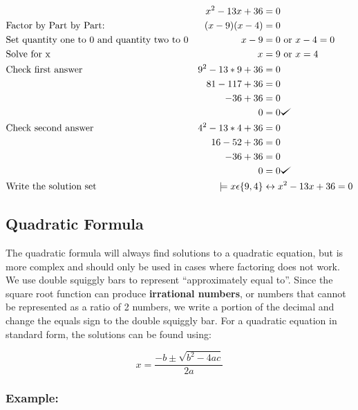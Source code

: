 \documentclass{book}
\theoremstyle{definition}
\def\checkmark{\tikz\fill[scale=0.4](0,.35) -- (.25,0) -- (1,.7) -- (.25,.15) -- cycle;}
\begin{document}
\begin{align*}\label{(6.9)}
&       &x^2-13x+36&=0 \\
&\text{Factor by Part by Part:}  &(x-9)(x-4)&=0 \\
&\text{Set quantity one to 0 and quantity two to 0}          &x-9&=0\text{ or }x-4=0\\
&\text{Solve for x}              &x&=9\text{ or }x = 4 \\
&\text{Check first answer}       &9^2-13*9+36  &= 0 \\
&                                &81-117+36    &= 0 \\
&                                &-36+36       &=0 \\
&                                &0            &=0 \checkmark{} \\
&\text{Check second answer}      &4^2-13*4+36  &=0 \\
&                                &16 - 52 + 36 &=0 \\
&                                &-36+36       &=0 \\
&                                &0            &=0 \checkmark{} \\
&\text{Write the solution set}   &\models x\epsilon\{9,4\} &\leftrightarrow x^2-13x+36=0
\end{align*}

\subsection{Quadratic Formula}

The quadratic formula will always find solutions to a quadratic equation, but is more complex and should only be used in cases where factoring does not work. We use double squiggly bars to represent ``approximately equal to''. Since the square root function can produce {\bf irrational numbers}, or numbers that cannot be represented as a ratio of 2 numbers, we write a portion of the decimal and change the equals sign to the double squiggly bar. For a quadratic equation in standard form, the solutions can be found using:

\begin{equation}
\label{(6.10)}
				       x= \frac{-b \pm \sqrt{b^2-4ac}}{2a}
\end{equation}


\subsubsection{Example:}
\end{document}
